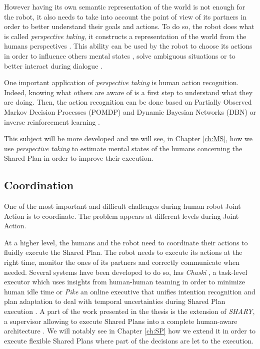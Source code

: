 \documentclass[english,a4paper,11pt,twoside]{StyleThese}
\begin{document}
However having its own semantic representation of the world is not enough for the robot, it also needs to take into account the point of view of its partners in order to better understand their goals and actions. To do so, the robot does what is called \textit{perspective taking}, it constructs a representation of the world from the humans perspectives \cite{breazeal2006using,milliez2014framework}. This ability can be used by the robot to choose its actions in order to influence others mental states \cite{gray2014manipulating}, solve ambiguous situations \cite{ros2010one} or to better interact during dialogue \cite{ferreira2015users}.

One important application of \textit{perspective taking} is human action recognition. Indeed, knowing what others are aware of is a first step to understand what they are doing. Then, the action recognition can be done based on Partially Observed Markov Decision Processes (POMDP) and Dynamic Bayesian Networks (DBN) \cite{baker2014modeling} or inverse reinforcement learning \cite{nagai2015probabilistic}.

This subject will be more developed and we will see, in Chapter \ref{ch:MS}, how we use \textit{perspective taking} to estimate mental states of the humans concerning the Shared Plan in order to improve their execution.


\subsection{Coordination}

\label{subsec:coordination_robot}

One of the most important and difficult challenges during human robot Joint Action is to coordinate. The problem appears at different levels during Joint Action. 

At a higher level, the humans and the robot need to coordinate their actions to fluidly execute the Shared Plan. The robot needs to execute its actions at the right time, monitor the ones of its partners and correctly communicate when needed. Several systems have been developed to do so, has \textit{Chaski} \cite{shah2011improved}, a task-level executor which uses insights from human-human teaming in order to minimize human idle time or \textit{Pike} an online executive that unifies intention recognition and plan adaptation to deal with temporal uncertainties during Shared Plan execution \cite{karpas2015robust}. A part of the work presented in the thesis is the extension of \textit{SHARY}, a supervisor allowing to execute Shared Plans into a complete human-aware architecture \cite{clodic2009shary}. We will notably see in Chapter \ref{ch:SP} how we extend it in order to execute flexible Shared Plans where part of the decisions are let to the execution.
 
\end{document}
